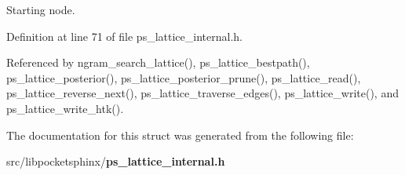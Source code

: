 \-Starting node. 



\-Definition at line 71 of file ps\-\_\-lattice\-\_\-internal.\-h.



\-Referenced by ngram\-\_\-search\-\_\-lattice(), ps\-\_\-lattice\-\_\-bestpath(), ps\-\_\-lattice\-\_\-posterior(), ps\-\_\-lattice\-\_\-posterior\-\_\-prune(), ps\-\_\-lattice\-\_\-read(), ps\-\_\-lattice\-\_\-reverse\-\_\-next(), ps\-\_\-lattice\-\_\-traverse\-\_\-edges(), ps\-\_\-lattice\-\_\-write(), and ps\-\_\-lattice\-\_\-write\-\_\-htk().



\-The documentation for this struct was generated from the following file\-:\begin{DoxyCompactItemize}
\item 
src/libpocketsphinx/{\bf ps\-\_\-lattice\-\_\-internal.\-h}\end{DoxyCompactItemize}
